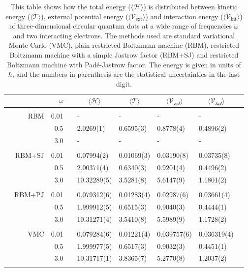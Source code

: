 \begin{table}
	\caption{This table shows how the total energy ($\langle\mathcal{H}\rangle$) is distributed between kinetic energy ($\langle\mathcal{T}\rangle$), external potential energy ($\langle\mathcal{V}_{\text{ext}}\rangle$) and interaction energy ($\langle\mathcal{V}_{\text{int}}\rangle$) of three-dimensional circular quantum dots at a wide range of frequencies $\omega$ and two interacting electrons. The methods used are standard variational Monte-Carlo (VMC), plain restricted Boltzmann machine (RBM), restricted Boltzmann machine with a simple Jastrow factor (RBM+SJ) and restricted Boltzmann machine with Padé-Jastrow factor. The energy is given in units of $\hbar$, and the numbers in parenthesis are the statistical uncertainties in the last digit.}
	\label{tab:splitfrequencyQD3D2P}
	\begin{tabularx}{\textwidth}{R{1cm}rrcR{2.3cm}R{2.3cm}R{2.3cm}R{2.3cm}R{0.3cm}} \hline\hline
		&\makecell{\\ \phantom{$N$} \\ \phantom{=}} & $\omega$ &&  &  &  &  \\ \hline \\
		&RBM & 0.01 && - & - & - & - \\
		&& 0.5 && 2.0269(1) & 0.6595(3) & 0.8778(4) & 0.4896(2) \\
		&& 3.0 && - & - & - & - \\ \hdashline \\
		
		&RBM+SJ & 0.01 && 0.07994(2) & 0.01069(3) & 0.03190(8) & 0.03735(8) \\
		&& 0.5 && 2.00371(4) & 0.6340(3) & 0.9201(4) & 0.4496(2) \\
		&& 3.0 && 10.32289(5) & 3.5281(8) & 5.6147(9) & 1.1801(2) \\ \hdashline \\
		
		&RBM+PJ & 0.01 && 0.079312(6) & 0.01283(4) & 0.02987(6) & 0.03661(4) \\
		&& 0.5 && 1.999912(5) & 0.6515(3) & 0.9040(3) & 0.4444(1) \\
		&& 3.0 && 10.31271(4) & 3.5410(8) & 5.5989(9) & 1.1728(2) \\ \hdashline \\
		
		&VMC & 0.01 && 0.079284(6) & 0.01221(4) & 0.039757(6) & 0.036319(4) \\
		&& 0.5 && 1.999977(5) & 0.6517(3) & 0.9032(3) & 0.4451(1) \\
		&& 3.0 && 10.31717(1) & 3.8365(7) & 5.2770(8) & 1.2037(2) \\ \hdashline \\
	\end{tabularx}
\end{table} 

